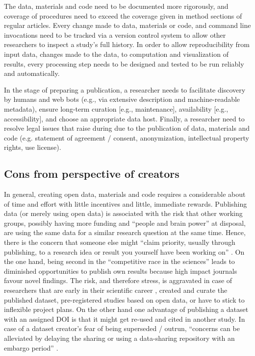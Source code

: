 The data, materials and code need to be documented more rigorously, and coverage
of procedures need to exceed the coverage given in method sections of regular
articles.
%
Every change made to data, materials or code, and command line invocations need
to be tracked via a version control system \citep[e.g.,][]{halchenko2021datalad}
to allow other researchers to inspect a study's full history.
%
In order to allow reproducibility from input data, changes made to the data, to
computation and visualization of results, every processing step needs to be
designed and tested to be run reliably and automatically.

In the stage of preparing a publication, a researcher needs to facilitate
discovery by humans and web bots (e.g., via extensive description and
machine-readable metadata), ensure long-term curation [e.g., maintenance],
availability [e.g., accessibility], and choose an appropriate data host.
Finally, a researcher need to resolve legal issues that raise during due to the
publication of data, materials and code (e.g. statement of agreement / consent,
anonymization, intellectual property rights, use license).


\subsection{Cons from perspective of creators}



In general, creating open data, materials and code requires a considerable about
of time and effort with little incentives and little, immediate rewards.
%
Publishing data (or merely using open data) is associated with the risk that
other working groups, possibly having more funding and ``people and brain
power'' at disposal, are using the same data for a similar research question at
the same time.
%
Hence, there is the concern that someone else might ``claim priority, usually
through publishing, to a research idea or result you yourself have been working
on'' \citep{laine2017afraid}.
%
On the one hand, being second in the ``competitive race in the sciences'' leads
to diminished opportunities to publish own results because high impact journals
favour novel findings.
%
The risk, and therefore stress, is aggravated in case of researchers that are
early in their scientific career \citep[cf.][]{toribio2021early}, created and
curate the published dataset, pre-registered studies based on open data, or have
to stick to inflexible project plans.
%
On the other hand one advantage of publishing a dataset with an assigned DOI is
that it might get re-used and cited in another study.
%
In case of a dataset creator's fear of being superseded / outrun, ``concerns can
be alleviated by delaying the sharing or using a data-sharing repository with an
embargo period'' \citep{nichols2017best}.


